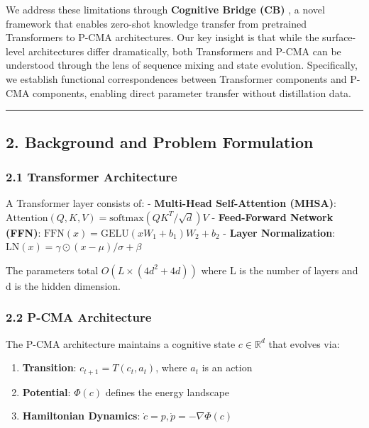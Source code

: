 \documentclass[
  11pt,
  a4paper,
]{article}
\providecommand{\tightlist}{%
  \setlength{\itemsep}{0pt}\setlength{\parskip}{0pt}}
\begin{document}
We address these limitations through \textbf{Cognitive Bridge (CB)} , a
novel framework that enables zero-shot knowledge transfer from
pretrained Transformers to P-CMA architectures. Our key insight is that
while the surface-level architectures differ dramatically, both
Transformers and P-CMA can be understood through the lens of sequence
mixing and state evolution. Specifically, we establish functional
correspondences between Transformer components and P-CMA components,
enabling direct parameter transfer without distillation data.

\begin{center}\rule{0.5\linewidth}{0.5pt}\end{center}

\subsection{2. Background and Problem
Formulation}\label{background-and-problem-formulation}

\subsubsection{2.1 Transformer
Architecture}\label{transformer-architecture}

A Transformer layer consists of: - \textbf{Multi-Head Self-Attention
(MHSA)}: \(\text{Attention}(Q, K, V) = \text{softmax}(QK^T/\sqrt{d})V\)
- \textbf{Feed-Forward Network (FFN)}:
\(\text{FFN}(x) = \text{GELU}(xW_1 + b_1)W_2 + b_2\) - \textbf{Layer
Normalization}: \(\text{LN}(x) = \gamma \odot (x - \mu)/\sigma + \beta\)

The parameters total \(O(L \times (4d^2 + 4d))\) where L is the number
of layers and d is the hidden dimension.

\subsubsection{2.2 P-CMA Architecture}\label{p-cma-architecture}

The P-CMA architecture maintains a cognitive state
\(c \in \mathbb{R}^d\) that evolves via:

\begin{enumerate}
\def\labelenumi{\arabic{enumi}.}
\tightlist
\item
  \textbf{Transition}: \(c_{t+1} = T(c_t, a_t)\), where \(a_t\) is an
  action
\item
  \textbf{Potential}: \(\Phi(c)\) defines the energy landscape
\item
  \textbf{Hamiltonian Dynamics}:
  \(\dot{c} = p, \dot{p} = -\nabla\Phi(c)\)
\end{enumerate}
\end{document}
